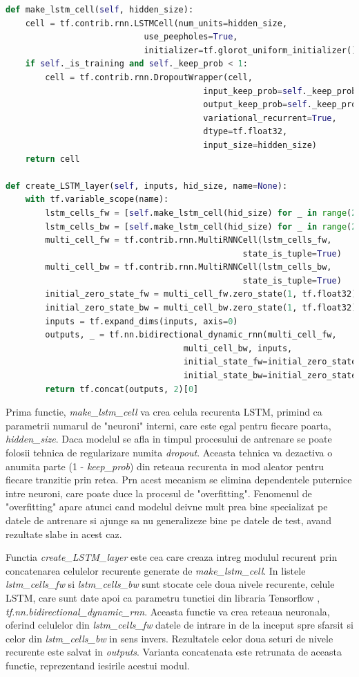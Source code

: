 \documentclass[a4paper,12pt]{book}
\begin{document}
				\begin{lstlisting}[language=Python, caption={Implementarea celulelor LSTM bidirectionale pe doua nivele folosind procedurile specifice ale librariei Tensorflow.}, xleftmargin=0cm]
def make_lstm_cell(self, hidden_size):
	cell = tf.contrib.rnn.LSTMCell(num_units=hidden_size, 
							use_peepholes=True, 		
							initializer=tf.glorot_uniform_initializer())
	if self._is_training and self._keep_prob < 1:
		cell = tf.contrib.rnn.DropoutWrapper(cell, 
										input_keep_prob=self._keep_prob,
										output_keep_prob=self._keep_prob, 
										variational_recurrent=True, 
										dtype=tf.float32, 
										input_size=hidden_size)
	return cell

def create_LSTM_layer(self, inputs, hid_size, name=None):
	with tf.variable_scope(name):
		lstm_cells_fw = [self.make_lstm_cell(hid_size) for _ in range(2)]
		lstm_cells_bw = [self.make_lstm_cell(hid_size) for _ in range(2)]
		multi_cell_fw = tf.contrib.rnn.MultiRNNCell(lstm_cells_fw, 
												state_is_tuple=True)
		multi_cell_bw = tf.contrib.rnn.MultiRNNCell(lstm_cells_bw, 
												state_is_tuple=True)
		initial_zero_state_fw = multi_cell_fw.zero_state(1, tf.float32)
		initial_zero_state_bw = multi_cell_bw.zero_state(1, tf.float32)
		inputs = tf.expand_dims(inputs, axis=0)
		outputs, _ = tf.nn.bidirectional_dynamic_rnn(multi_cell_fw, 
									multi_cell_bw, inputs, 
									initial_state_fw=initial_zero_state_fw, 
									initial_state_bw=initial_zero_state_bw)
		return tf.concat(outputs, 2)[0]				\end{lstlisting}
		Prima functie, \textit{make\_lstm\_cell} va crea celula recurenta LSTM, primind ca parametrii numarul de "neuroni" interni, care este egal pentru fiecare poarta, \textit{hidden\_size}. Daca modelul se afla in timpul procesului de antrenare se poate folosii tehnica de regularizare numita \textit{dropout}. Aceasta tehnica va dezactiva o anumita parte (1 - \textit{keep\_prob}) din reteaua recurenta in mod aleator pentru fiecare tranzitie prin retea. Prn acest mecanism se elimina dependentele puternice intre neuroni, care poate duce la procesul de "overfitting". Fenomenul de "overfitting" apare atunci cand modelul deivne mult prea bine specializat pe datele de antrenare si ajunge sa nu generalizeze bine pe datele de test, avand rezultate slabe in acest caz. \par
		Functia \textit{create\_LSTM\_layer} este cea care creaza intreg modulul recurent prin concatenarea celulelor recurente generate de  \textit{make\_lstm\_cell}. In listele \textit{lstm\_cells\_fw} si \textit{lstm\_cells\_bw} sunt stocate cele doua nivele recurente, celule LSTM,  care sunt date apoi ca parametru tunctiei din libraria Tensorflow \cite{tensorflow}, \textit{tf.nn.bidirectional\_dynamic\_rnn}. Aceasta functie va crea reteaua neuronala, oferind celulelor din \textit{lstm\_cells\_fw} datele de intrare in de la inceput spre sfarsit si celor din \textit{lstm\_cells\_bw} in sens invers. Rezultatele celor doua seturi de nivele recurente este salvat in \textit{outputs}. Varianta concatenata este retrunata de aceasta functie, reprezentand iesirile acestui modul. \par
		
\end{document}
